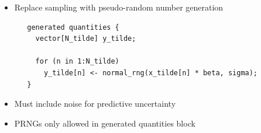 \documentclass[10pt]{report}
\begin{document}
\begin{itemize}
\item Replace sampling with pseudo-random number generation
{\footnotesize
\begin{Verbatim}
   generated quantities {
     vector[N_tilde] y_tilde;

     for (n in 1:N_tilde) 
       y_tilde[n] <- normal_rng(x_tilde[n] * beta, sigma);
   }
\end{Verbatim}
}
\item Must include noise for predictive uncertainty
\item PRNGs only allowed in generated quantities block
\end{itemize}



\end{document}

